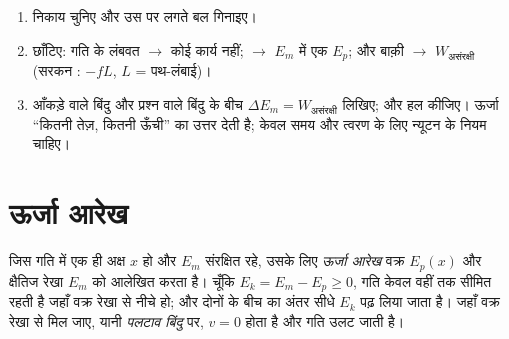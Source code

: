 \begin{method}[किसी भी गति का ऊर्जा-लेखा]\label{met:g12:work-and-energy:audit}
\begin{enumerate}
  \item निकाय चुनिए और उस पर लगते बल गिनाइए।
  \item छाँटिए: गति के लंबवत $\to$ कोई कार्य नहीं; 
        $\to$ $E_m$ में एक $E_p$; और बाक़ी $\to$ $W_{\text{असंरक्षी}}$ (सरकन
        : $-fL$, $L$ = पथ-लंबाई)।
  \item आँकड़े वाले बिंदु और प्रश्न वाले बिंदु के बीच $\Delta E_m = W_{\text{असंरक्षी}}$ लिखिए; और हल
        कीजिए। ऊर्जा ``कितनी तेज़, कितनी ऊँची'' का उत्तर देती है;
        केवल समय और त्वरण के लिए न्यूटन के नियम चाहिए।
\end{enumerate}
\end{method}

\section{ऊर्जा आरेख}

\begin{definition}[ऊर्जा आरेख, पलटाव बिंदु]\label{def:g12:work-and-energy:diagram}
जिस गति में एक ही अक्ष $x$ हो और $E_m$ संरक्षित रहे, उसके लिए
\emph{ऊर्जा आरेख} वक्र $E_p(x)$ और क्षैतिज रेखा $E_m$ को
आलेखित करता है। चूँकि $E_k = E_m - E_p \geq 0$, गति केवल वहीं तक सीमित रहती है जहाँ वक्र रेखा
से नीचे हो; और दोनों के बीच का अंतर सीधे $E_k$ पढ़ लिया जाता है। जहाँ वक्र
रेखा से मिल जाए, यानी \emph{पलटाव बिंदु} पर, $v = 0$ होता
है और गति उलट जाती है।
\end{definition}

